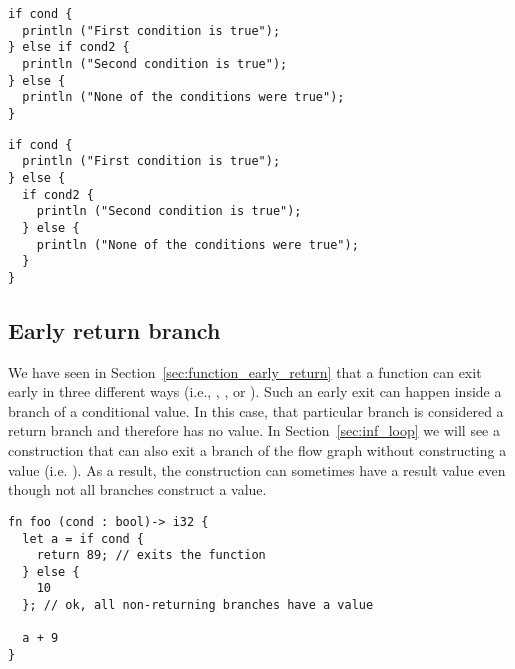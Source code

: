 \begin{minipage}[t][][t]{0.47\linewidth}
\begin{lstlisting}[style=coloredverbatim, caption=Using a \token{if} as the value of the \token{else} branch]
if cond {
  println ("First condition is true");
} else if cond2 {
  println ("Second condition is true");
} else {
  println ("None of the conditions were true");
}
\end{lstlisting}
\end{minipage}\hspace{10pt}%
\begin{minipage}[t][][t]{0.47\linewidth}
  \begin{lstlisting}[style=coloredverbatim, caption=Using a block as the value of the \token{else} branch]
if cond {
  println ("First condition is true");
} else {
  if cond2 {
    println ("Second condition is true");
  } else {
    println ("None of the conditions were true");
  }
}
  \end{lstlisting}
\end{minipage}
\vspace{-10pt}%

\subsection{Early return branch}


We have seen in Section~\ref{sec:function_early_return} that a function can exit
early in three different ways (i.e., , , or
). Such an early exit can happen inside a branch of a conditional
value. In this case, that particular branch is considered a return branch and
therefore has no value. In Section~\ref{sec:inf_loop} we will see a construction
that can also exit a branch of the flow graph without constructing a value (i.e.
). As a result, the  construction can sometimes have a
result value even though not all branches construct a value.




\begin{lstlisting}[style=coloredverbatim, caption=Early return in \token{if} condition, label=lst:if_cond_early_return]
fn foo (cond : bool)-> i32 {
  let a = if cond {
    return 89; // exits the function
  } else {
    10
  }; // ok, all non-returning branches have a value

  a + 9
}
\end{lstlisting}

